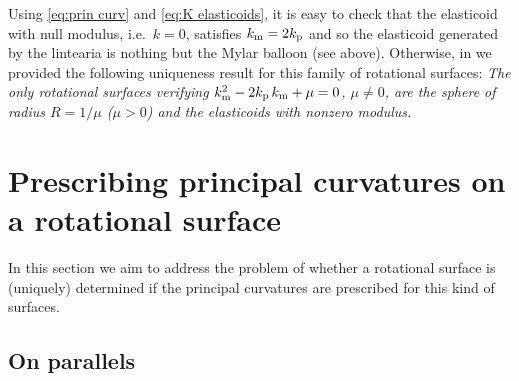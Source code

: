 \documentclass[leqno,11pt]{amsart}
\theoremstyle{definition}
\numberwithin{equation}{section}
\begin{document}
Using \eqref{eq:prin curv} and \eqref{eq:K elasticoids}, it is easy to check that
the elasticoid with null modulus, i.e.\ $k=0$, satisfies $k_{\text m}=2 k_{\text p}$ and so the elasticoid generated by the lintearia is nothing but the Mylar balloon (see above). Otherwise, in \cite[Theorem 3]{CC22} we provided the following uniqueness result for this family of rotational surfaces:
{\em The only rotational surfaces verifying $k_{\text m}^2-2 k_{\text p}\, k_{\text m} + \mu=0$, $\mu \neq 0$, are the sphere of radius $R=1/\mu$ ($\mu >0$) and the elasticoids with nonzero modulus.}




\section{Prescribing principal curvatures on a rotational surface}\label{Sect3}

In this section we aim to address the problem of whether a rotational surface is (uniquely) determined if the principal curvatures are prescribed for this kind of surfaces.

\subsection{On parallels}
\end{document}
